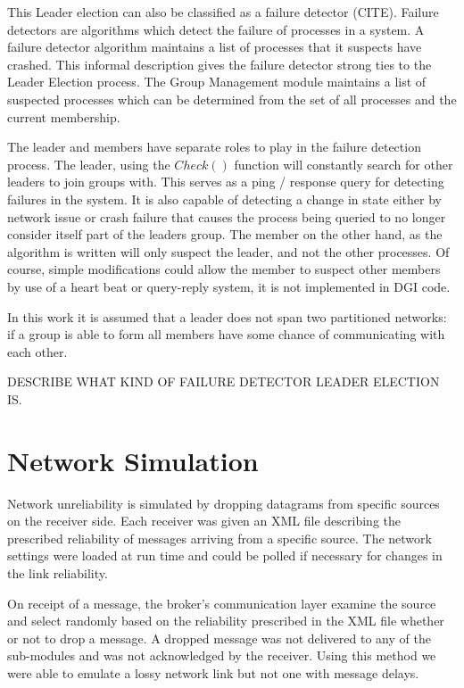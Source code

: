 This Leader election can also be classified as a failure detector 
(CITE). Failure detectors are algorithms which detect the failure of processes in a 
system. A failure detector algorithm maintains a list of processes that it suspects have
crashed. This informal description gives the failure detector strong ties to the
Leader Election process. The Group Management module maintains a list of 
suspected processes which can be determined from the set of all processes and the current
membership. 

The leader and members have separate roles to play in the failure detection
process. The leader, using the $Check()$ function will constantly search for 
other leaders to join groups with. This serves as a ping / response query for 
detecting failures in the system. It is also capable of detecting a change in state either
by network issue or crash failure that causes the process being queried to no 
longer consider itself part of the leaders group. The member on the other hand, as the
algorithm is written will only suspect the leader, and not the other processes.
Of course, simple modifications could allow the member to suspect other members
by use of a heart beat or query-reply system, it is not implemented in DGI code.

In this work it is assumed that a leader does not span two partitioned networks:
if a group is able to form all members have some chance of communicating with
each other.

DESCRIBE WHAT KIND OF FAILURE DETECTOR LEADER ELECTION IS.

\section{Network Simulation}

Network unreliability is simulated by dropping datagrams from specific sources 
on the receiver side. Each receiver was given an XML file describing the 
prescribed reliability of messages arriving from a specific source. The 
network settings were loaded at run time and could be polled if necessary for 
changes in the link reliability.

On receipt of a message, the broker's communication layer examine the source 
and select randomly based on the reliability prescribed in the XML file whether 
or not to drop a message. A dropped message was not delivered to any of the 
sub-modules and was not acknowledged by the receiver. Using this method we were 
able to emulate a lossy network link but not one with message delays.

